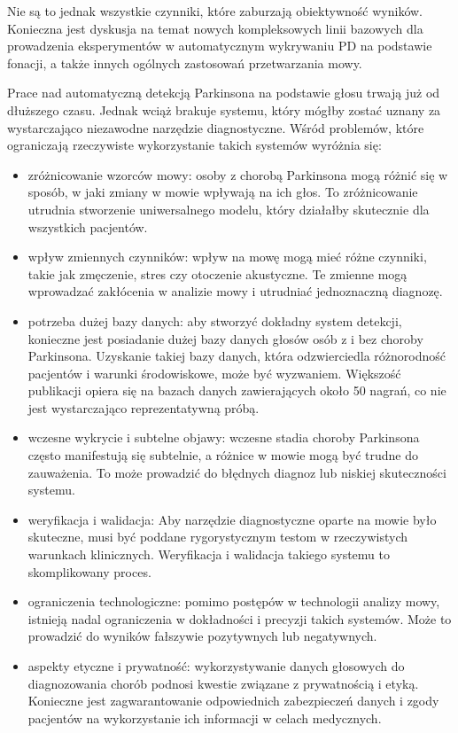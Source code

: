 Nie są to jednak wszystkie czynniki, które zaburzają obiektywność wyników.
Konieczna jest dyskusja na temat nowych kompleksowych linii bazowych dla prowadzenia eksperymentów w automatycznym wykrywaniu PD na podstawie fonacji,
a także innych ogólnych zastosowań przetwarzania mowy.

Prace nad automatyczną detekcją Parkinsona na podstawie głosu trwają już od dłuższego czasu.
Jednak wciąż brakuje systemu, który mógłby zostać uznany za wystarczająco niezawodne narzędzie diagnostyczne.
Wśród problemów, które ograniczają rzeczywiste wykorzystanie takich systemów wyróżnia się:
\begin{itemize}[itemsep=0.1pt]
	\item zróżnicowanie wzorców mowy: osoby z chorobą Parkinsona mogą różnić się w sposób, w jaki zmiany w mowie wpływają na ich głos.
To zróżnicowanie utrudnia stworzenie uniwersalnego modelu, który działałby skutecznie dla wszystkich pacjentów.
	\item wpływ zmiennych czynników: wpływ na mowę mogą mieć różne czynniki, takie jak zmęczenie, stres czy otoczenie akustyczne.
Te zmienne mogą wprowadzać zakłócenia w analizie mowy i utrudniać jednoznaczną diagnozę.
	\item potrzeba dużej bazy danych: aby stworzyć dokładny system detekcji, konieczne jest posiadanie dużej bazy danych głosów osób z i
bez choroby Parkinsona.
Uzyskanie takiej bazy danych, która odzwierciedla różnorodność pacjentów i warunki środowiskowe, może być wyzwaniem.
Większość publikacji opiera się na bazach danych zawierających około 50 nagrań, co nie jest wystarczająco reprezentatywną próbą.
	\item wczesne wykrycie i subtelne objawy: wczesne stadia choroby Parkinsona często manifestują się subtelnie, a różnice w mowie mogą być
trudne do zauważenia.
To może prowadzić do błędnych diagnoz lub niskiej skuteczności systemu.
	\item weryfikacja i walidacja: Aby narzędzie diagnostyczne oparte na mowie było skuteczne, musi być poddane rygorystycznym testom w rzeczywistych
warunkach klinicznych.
Weryfikacja i walidacja takiego systemu to skomplikowany proces.
	\item ograniczenia technologiczne: pomimo postępów w technologii analizy mowy, istnieją nadal ograniczenia w dokładności i precyzji takich systemów.
Może to prowadzić do wyników fałszywie pozytywnych lub negatywnych.
	\item aspekty etyczne i prywatność: wykorzystywanie danych głosowych do diagnozowania chorób podnosi kwestie związane z prywatnością i etyką.
Konieczne jest zagwarantowanie odpowiednich zabezpieczeń danych i zgody pacjentów na wykorzystanie ich informacji w celach medycznych.
\end{itemize}

